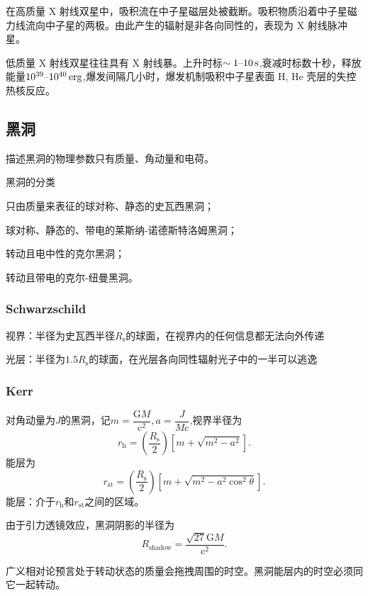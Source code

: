 \documentclass[../天体物理基础.tex]{subfiles}
\begin{document}
在高质量 X 射线双星中，吸积流在中子星磁层处被截断。吸积物质沿着中子星磁力线流向中子星的两极。由此产生的辐射是非各向同性的，表现为 X 射线脉冲星。

低质量 X 射线双星往往具有 X 射线暴。上升时标$\sim1\text{\textendash}10\,\unit{s}$,衰减时标数十秒，释放能量$10^{39}\text{\textendash}10^{40}\,\unit{erg}$,爆发间隔几小时，爆发机制吸积中子星表面 H, He 壳层的失控热核反应。

\subsection{黑洞}
描述黑洞的物理参数只有质量、角动量和电荷。

黑洞的分类

只由质量来表征的球对称、静态的史瓦西黑洞；

球对称、静态的、带电的莱斯纳{}-{}诺德斯特洛姆黑洞；

转动且电中性的克尔黑洞；

转动且带电的克尔{}-{}纽曼黑洞。

\subsubsection{Schwarzschild}
视界：半径为史瓦西半径$R_{\text{s}}$的球面，在视界内的任何信息都无法向外传递

光层：半径为$1.5R_{\text{s}}$的球面，在光层各向同性辐射光子中的一半可以逃逸

\subsubsection{Kerr}
对角动量为$J$的黑洞，记$m=\dfrac{\mathrm{G}M}{\mathrm{c}^{2}},a=\dfrac{J}{M\mathrm{c}}$,视界半径为
\begin{equation}
r_{\text{h}}=\left(\frac{R_{\text{s}}}{2}\right)\left[m+\sqrt{m^{2}-a^{2}}\right].
\end{equation}
能层为
\begin{equation}
r_{\text{st}}=\left(\frac{R_{\text{s}}}2\right)\left[m+\sqrt{m^{2}-a^{2}\cos^{2}\theta}\right].
\end{equation}
能层：介于$r_{\text{h}}$和$r_{\text{st}}$之间的区域。

由于引力透镜效应，黑洞阴影的半径为
\begin{equation}
R_{\text{shadow}}=\frac{\sqrt{27}\mathrm{G}M}{\mathrm{c}^{2}}.
\end{equation}

广义相对论预言处于转动状态的质量会拖拽周围的时空。黑洞能层内的时空必须同它一起转动。
\end{document}

